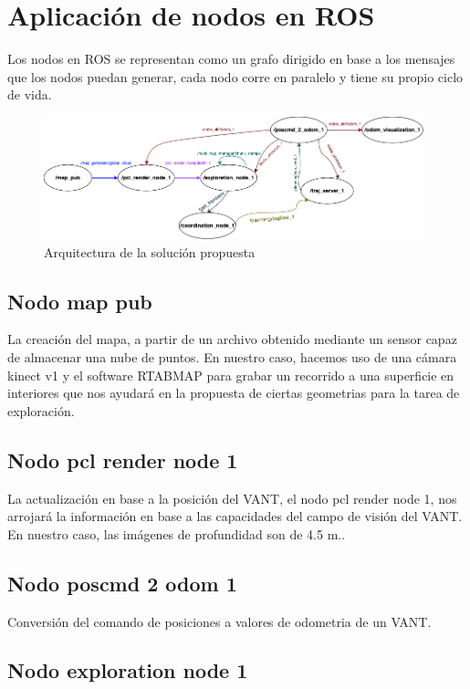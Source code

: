 \section{Aplicación de nodos en ROS}

Los nodos en ROS se representan como un grafo dirigido en base a los mensajes que los nodos puedan generar, cada nodo corre en paralelo y tiene su propio ciclo de vida.

\begin{figure}[h]
\centering
\includegraphics[width=0.98\textwidth]{images/ros_nodes}
\caption{Arquitectura de la solución propuesta}
\end{figure}

\subsection*{Nodo map pub}
La creación del mapa, a partir de un archivo obtenido mediante un sensor capaz de almacenar una nube de puntos.
En nuestro caso, hacemos uso de una cámara kinect v1 y el software RTABMAP para grabar un recorrido a una superficie en interiores que nos ayudará en la propuesta de ciertas geometrias para la tarea de exploración.

\subsection*{Nodo pcl render node 1}
La actualización en base a la posición del VANT, el nodo pcl render node 1, nos arrojará la información en base a las capacidades del campo de visión del VANT.
En nuestro caso, las imágenes de profundidad son de 4.5 m..

\subsection*{Nodo poscmd 2 odom 1}
Conversión del comando de posiciones a valores de odometria de un VANT.

\subsection*{Nodo exploration node 1}

